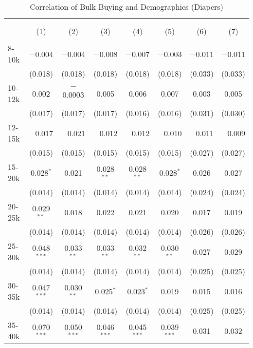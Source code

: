 
\begin{table}[!htbp] \centering 
  \caption{Correlation of Bulk Buying and Demographics (Diapers)} 
  \label{tab:discountingBehavior8444} 
\begin{tabular}{@{\extracolsep{5pt}}lccccccc} 
\\[-1.8ex]\hline 
\hline \\[-1.8ex] 
\\[-1.8ex] & (1) & (2) & (3) & (4) & (5) & (6) & (7)\\ 
\hline \\[-1.8ex] 
 8-10k & $-$0.004 & $-$0.004 & $-$0.008 & $-$0.007 & $-$0.003 & $-$0.011 & $-$0.011 \\ 
  & (0.018) & (0.018) & (0.018) & (0.018) & (0.018) & (0.033) & (0.033) \\ 
  10-12k & 0.002 & $-$0.0003 & 0.005 & 0.006 & 0.007 & 0.003 & 0.005 \\ 
  & (0.017) & (0.017) & (0.017) & (0.016) & (0.016) & (0.031) & (0.030) \\ 
  12-15k & $-$0.017 & $-$0.021 & $-$0.012 & $-$0.012 & $-$0.010 & $-$0.011 & $-$0.009 \\ 
  & (0.015) & (0.015) & (0.015) & (0.015) & (0.015) & (0.027) & (0.027) \\ 
  15-20k & 0.028$^{*}$ & 0.021 & 0.028$^{**}$ & 0.028$^{**}$ & 0.028$^{*}$ & 0.026 & 0.027 \\ 
  & (0.014) & (0.014) & (0.014) & (0.014) & (0.014) & (0.024) & (0.024) \\ 
  20-25k & 0.029$^{**}$ & 0.018 & 0.022 & 0.021 & 0.020 & 0.017 & 0.019 \\ 
  & (0.014) & (0.014) & (0.014) & (0.014) & (0.014) & (0.026) & (0.026) \\ 
  25-30k & 0.048$^{***}$ & 0.033$^{**}$ & 0.033$^{**}$ & 0.032$^{**}$ & 0.030$^{**}$ & 0.027 & 0.029 \\ 
  & (0.014) & (0.014) & (0.014) & (0.014) & (0.014) & (0.025) & (0.025) \\ 
  30-35k & 0.047$^{***}$ & 0.030$^{**}$ & 0.025$^{*}$ & 0.023$^{*}$ & 0.019 & 0.015 & 0.016 \\ 
  & (0.014) & (0.014) & (0.014) & (0.014) & (0.014) & (0.025) & (0.025) \\ 
  35-40k & 0.070$^{***}$ & 0.050$^{***}$ & 0.046$^{***}$ & 0.045$^{***}$ & 0.039$^{***}$ & 0.031 & 0.032 \\ 

\end{tabular}
\end{table}
